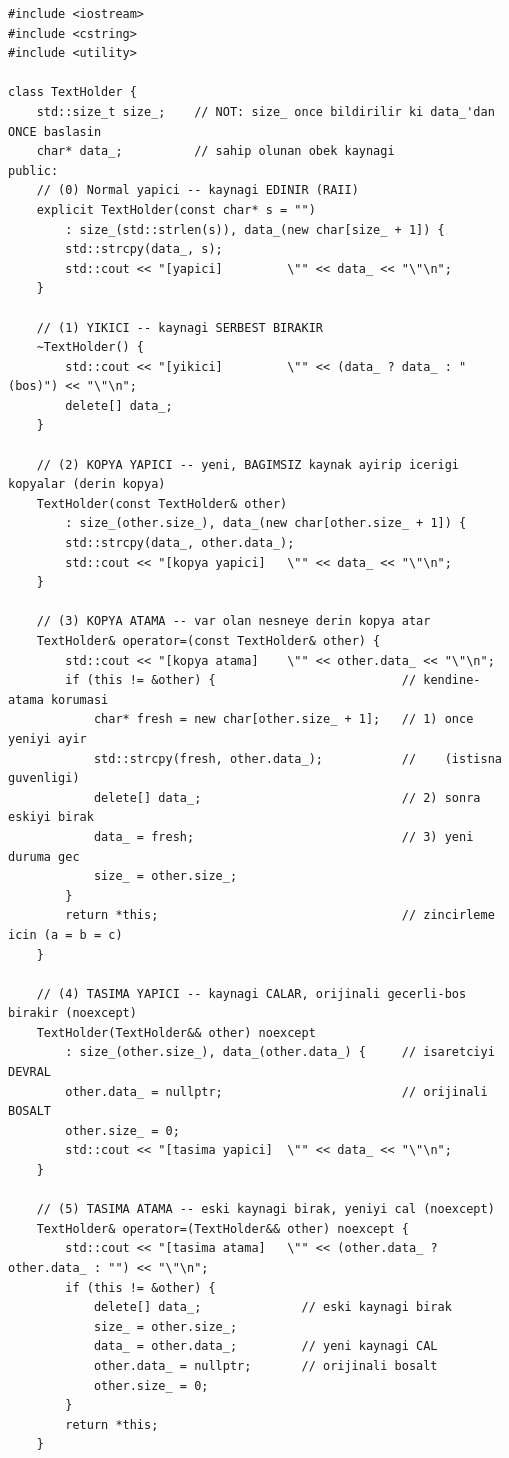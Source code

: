 \documentclass[11pt,a4paper]{article}
\begin{document}
\begin{lstlisting}
#include <iostream>
#include <cstring>
#include <utility>

class TextHolder {
    std::size_t size_;    // NOT: size_ once bildirilir ki data_'dan ONCE baslasin
    char* data_;          // sahip olunan obek kaynagi
public:
    // (0) Normal yapici -- kaynagi EDINIR (RAII)
    explicit TextHolder(const char* s = "")
        : size_(std::strlen(s)), data_(new char[size_ + 1]) {
        std::strcpy(data_, s);
        std::cout << "[yapici]         \"" << data_ << "\"\n";
    }

    // (1) YIKICI -- kaynagi SERBEST BIRAKIR
    ~TextHolder() {
        std::cout << "[yikici]         \"" << (data_ ? data_ : "(bos)") << "\"\n";
        delete[] data_;
    }

    // (2) KOPYA YAPICI -- yeni, BAGIMSIZ kaynak ayirip icerigi kopyalar (derin kopya)
    TextHolder(const TextHolder& other)
        : size_(other.size_), data_(new char[other.size_ + 1]) {
        std::strcpy(data_, other.data_);
        std::cout << "[kopya yapici]   \"" << data_ << "\"\n";
    }

    // (3) KOPYA ATAMA -- var olan nesneye derin kopya atar
    TextHolder& operator=(const TextHolder& other) {
        std::cout << "[kopya atama]    \"" << other.data_ << "\"\n";
        if (this != &other) {                          // kendine-atama korumasi
            char* fresh = new char[other.size_ + 1];   // 1) once yeniyi ayir
            std::strcpy(fresh, other.data_);           //    (istisna guvenligi)
            delete[] data_;                            // 2) sonra eskiyi birak
            data_ = fresh;                             // 3) yeni duruma gec
            size_ = other.size_;
        }
        return *this;                                  // zincirleme icin (a = b = c)
    }

    // (4) TASIMA YAPICI -- kaynagi CALAR, orijinali gecerli-bos birakir (noexcept)
    TextHolder(TextHolder&& other) noexcept
        : size_(other.size_), data_(other.data_) {     // isaretciyi DEVRAL
        other.data_ = nullptr;                         // orijinali BOSALT
        other.size_ = 0;
        std::cout << "[tasima yapici]  \"" << data_ << "\"\n";
    }

    // (5) TASIMA ATAMA -- eski kaynagi birak, yeniyi cal (noexcept)
    TextHolder& operator=(TextHolder&& other) noexcept {
        std::cout << "[tasima atama]   \"" << (other.data_ ? other.data_ : "") << "\"\n";
        if (this != &other) {
            delete[] data_;              // eski kaynagi birak
            size_ = other.size_;
            data_ = other.data_;         // yeni kaynagi CAL
            other.data_ = nullptr;       // orijinali bosalt
            other.size_ = 0;
        }
        return *this;
    }


\end{lstlisting}
\end{document}
